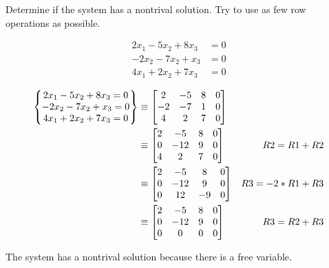 \documentclass{../mathhomework}
\newenvironment{Mat}{\begin{bmatrix}}{\end{bmatrix}}
\begin{document}
\begin{problem}[1.5\#1]
    Determine if the system  has a nontrival solution. Try to use as few row operations as possible.

    \begin{align*}
        2x_1 - 5x_2 + 8x_3 &= 0 \\
        -2x_2 - 7x_2 + x_3 &= 0 \\
        4x_1 + 2x_2 + 7x_3 &= 0
    \end{align*}

    \begin{solution}
        \begin{align*}
            \begin{Bmatrix}
                2x_1 - 5x_2 + 8x_3 = 0 \\
                -2x_2 - 7x_2 + x_3 = 0 \\
                4x_1 + 2x_2 + 7x_3 = 0
            \end{Bmatrix} & \equiv
            \begin{Mat}
                2 & -5 & 8 & 0 \\
                -2 & -7 & 1 & 0 \\
                4 & 2 & 7 & 0
            \end{Mat} \\ & \equiv
            \begin{Mat}
                2 & -5 & 8 & 0 \\
                0 & -12 & 9 & 0 \\
                4 & 2 & 7 & 0
            \end{Mat} & R2 = R1 + R2 \\ & \equiv
            \begin{Mat}
                2 & -5 & 8 & 0 \\
                0 & -12 & 9 & 0 \\
                0 & 12 & -9 & 0
            \end{Mat} & R3 = -2 * R1 + R3 \\ & \equiv
            \begin{Mat}
                2 & -5 & 8 & 0 \\
                0 & -12 & 9 & 0 \\
                0 & 0 & 0 & 0
            \end{Mat} & R3 = R2 + R3
        \end{align*}

        The system has a nontrival solution because there is a free variable.
    \end{solution}
\end{problem}
\end{document}
